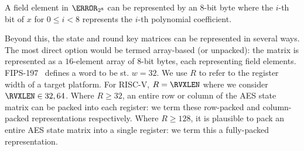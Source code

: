 
A field element in $\F_{2^8}$ can be represented by an
$8$-bit byte
where the $i$-th bit of $x$ for $0 \leq i < 8$ represents the $i$-th 
polynomial coefficient.

Beyond this, the state and round key matrices can be represented in
several ways.
The most direct option would be termed
array-based (or unpacked):
the matrix is represented as a $16$-element array of $8$-bit bytes, each
representing field elements.
FIPS-197~\cite{FIPS:197} defines a word to be st. $w = 32$.
We use $R$ to refer to the register width of a target platform.
For RISC-V, $R = \RVXLEN$ where we consider $\RVXLEN \in {32,64}$.
Where $R \geq  32$,
an entire row or column of the AES state matrix can be packed into each 
register:
we term these
   row-packed  
and
column-packed
representations respectively.
Where $R \geq 128$, 
it is plausible to pack
an entire AES state matrix
into a single register: 
we term this a 
 fully-packed 
representation.

